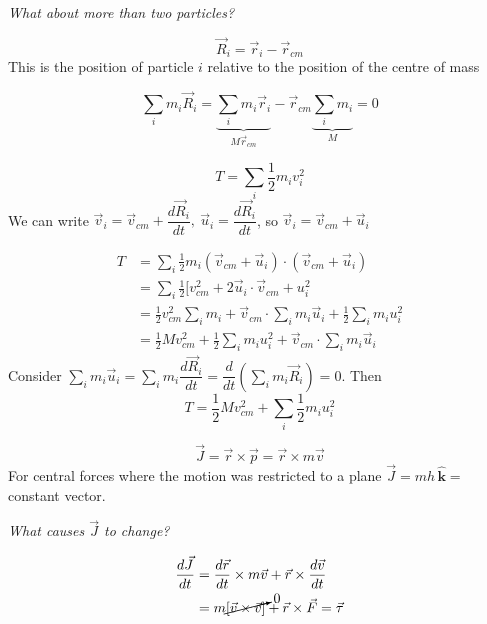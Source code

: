 \documentclass[twoside]{scrartcl}
\let\oldhat\hat
\renewcommand{\hat}[1]{\,\oldhat{\boldsymbol{\mathbf{#1}}}}
\begin{document}
\emph{What about more than two particles?}\\

\begin{definition}
\[\vec{R}_i = \vec{r}_i - \vec{r}_{cm}\]	
This is the position of particle $i$ relative to the position of the centre of mass
\end{definition}

\[\sum_im_i\vec{R}_i = \underbrace{\sum_im_i\vec{r}_i}_{M\vec{r}_{cm}}- \vec{r}_{cm}\underbrace{\sum_im_i}_{M} = 0\]









\[T = \sum_i \frac{1}{2}m_iv_i^2\]
We can write $\vec{v}_i = \vec{v}_{cm} + \dfrac{d\vec{R}_i}{dt},~\vec{u}_i = \dfrac{d\vec{R}_i}{dt}$, so $\vec{v}_i = \vec{v}_{cm} + \vec{u}_i$

\[\begin{aligned}T &= \sum_i \frac{1}{2}m_i(\vec{v}_{cm}+\vec{u}_i) \cdot(\vec{v}_{cm}+\vec{u}_i)\\
&= \sum_i \frac{1}{2}[v_{cm}^2 + 2\vec{u}_i\cdot\vec{v}_{cm} + u_i^2\\
&= 	\frac{1}{2}v_{cm}^2\sum_i m_i + \vec{v}_{cm}\cdot\sum_im_i\vec{u}_i + \frac{1}{2}\sum_im_iu_i^2\\
&= \frac{1}{2}Mv_{cm}^2 + \frac{1}{2}\sum_im_iu_i^2 + \vec{v}_{cm}\cdot\sum_im_i\vec{u}_i
\end{aligned}
\]
Consider $\sum_i m_i\vec{u}_i = \sum_im_i\dfrac{d\vec{R}_i}{dt} = \dfrac{d}{dt}(\sum_i m_i\vec{R}_i) = 0$. Then 
\begin{equation}\boxed{T = \frac{1}{2}Mv_{cm}^2 + \sum_i\frac{1}{2}m_iu_i^2}\end{equation}


\[\vec{J} = \vec{r} \times \vec{p} = \vec{r} \times m\vec{v}\]
For central forces where the motion was restricted to a plane $\vec{J} = mh\hat{k} =$ constant vector. 

\emph{What causes $\vec{J}$ to change?}

\[\begin{aligned}\frac{d\vec{J}}{dt} &= \frac{d\vec{r}}{dt} \times m \vec{v} + \vec{r}\times \frac{d\vec{v}}{dt}\\ &= m\cancelto{0}{[\vec{v} \times \vec{v}]} + \vec{r} \times \vec{F} = \vec{\tau}\end{aligned}
\]
\end{document}
